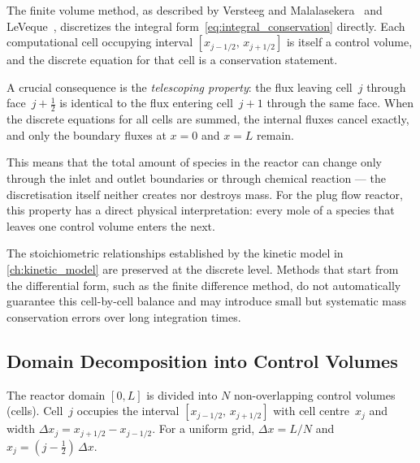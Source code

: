 The finite volume method, as described by Versteeg and Malalasekera~\cite{Versteeg2007} and LeVeque~\cite{LeVeque2002}, discretizes the integral form~\eqref{eq:integral_conservation} directly. Each computational cell occupying interval \([x_{j-1/2},\, x_{j+1/2}]\) is itself a control volume, and the discrete equation for that cell is a conservation statement.

\newpage
A crucial consequence is the \emph{telescoping property}: the flux leaving cell~\(j\) through face~\(j + \tfrac{1}{2}\) is identical to the flux entering cell~\(j{+}1\) through the same face. When the discrete equations for all cells are summed, the internal fluxes cancel exactly, and only the boundary fluxes at \(x = 0\) and \(x = L\) remain. 

This means that the total amount of species in the reactor can change only through the inlet and outlet boundaries or through chemical reaction --- the discretisation itself neither creates nor destroys mass. For the plug flow reactor, this property has a direct physical interpretation: every mole of a species that leaves one control volume enters the next. 

The stoichiometric relationships established by the kinetic model in \cref{ch:kinetic_model} are preserved at the discrete level. Methods that start from the differential form, such as the finite difference method, do not automatically guarantee this cell-by-cell balance and may introduce small but systematic mass conservation errors over long integration times.

\subsection{Domain Decomposition into Control Volumes}\label{ssec:control_volumes}

The reactor domain \([0, L]\) is divided into \(N\) non-overlapping control volumes (cells). Cell~\(j\) occupies the interval \([x_{j-1/2},\, x_{j+1/2}]\) with cell centre~\(x_j\) and width \(\Delta x_j = x_{j+1/2} - x_{j-1/2}\). For a uniform grid, \(\Delta x = L / N\) and \(x_j = (j - \tfrac{1}{2})\,\Delta x\).

